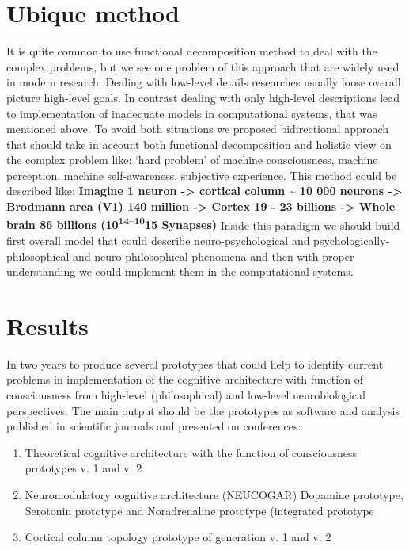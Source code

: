 \section{Ubique method}\label{ubique-method}

It is quite common to use functional decomposition method to deal with
the complex problems, but we see one problem of this approach that are
widely used in modern research. Dealing with low-level details
researches usually loose overall picture high-level goals. In contrast
dealing with only high-level descriptions lead to implementation of
inadequate models in computational systems, that was mentioned above. To
avoid both situations we proposed bidirectional approach that should
take in account both functional decomposition and holistic view on the
complex problem like: `hard problem' of machine consciousness, machine
perception, machine self-awareness, subjective experience. This method
could be described like: \textbf{Imagine 1 neuron -\textgreater{}
cortical column \textasciitilde{} 10 000 neurons -\textgreater{}
Brodmann area (V1) 140 million -\textgreater{} Cortex 19 - 23 billions
-\textgreater{} Whole brain 86 billions (10\textsuperscript{14--10}15
Synapses)} Inside this paradigm we should build first overall model that
could describe neuro-psychological and psychologically-philosophical and
neuro-philosophical phenomena and then with proper understanding we
could implement them in the computational systems.

\section{Results}\label{results}

In two years to produce several prototypes that could help to identify
current problems in implementation of the cognitive architecture with
function of consciousness from high-level (philosophical) and low-level
neurobiological perspectives. The main output should be the prototypes
as software and analysis published in scientific journals and presented
on conferences:

\begin{enumerate}
\def\labelenumi{\arabic{enumi}.}
\itemsep1pt\parskip0pt
\item
  Theoretical cognitive architecture with the function of consciousness
  prototypes v. 1 and v. 2
\item
  Neuromodulatory cognitive architecture (NEUCOGAR) Dopamine prototype,
  Serotonin prototype and Noradrenaline prototype (integrated prototype
\item
  Cortical column topology prototype of generation v. 1 and v. 2
\end{enumerate}

